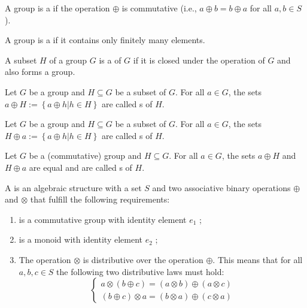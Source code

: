 \begin{defi}
A group \soplus is a  if the operation $\oplus$ is commutative (i.e., $a\oplus b = b\oplus a$ for all $a, b\in S$).
\cite{Oppliger:2011:CC:2049860}
\end{defi}

\begin{defi}
A group \soplus is a  if it contains only finitely many elements.
\cite{Oppliger:2011:CC:2049860}
\end{defi}

\begin{defi}[Subgroup]
A subset $H$ of a group $G$ is a  of $G$ if it is closed under the operation of $G$ and also forms a group.
\cite{Oppliger:2011:CC:2049860}
\end{defi}

\begin{defi}
Let $G$ be a group and $H\subseteq G$ be a subset of $G$. For all $a\in G$, the sets $a\oplus H := \left\{a\oplus h | h\in H\right\}$ are called s of $H$.
\cite{Oppliger:2011:CC:2049860}
\end{defi}

\begin{defi}
Let $G$ be a group and $H\subseteq G$ be a subset of $G$. For all $a\in G$, the sets $H\oplus a := \left\{a\oplus h | h\in H\right\}$ are called s of $H$.
\cite{Oppliger:2011:CC:2049860}
\end{defi}

\begin{defi}[Coset]
Let $G$ be a (commutative) group and $H\subseteq G$. For all $a\in G$, the sets $a\oplus H$ and $H\oplus a$ are equal and are called s of $H$.
\cite{Oppliger:2011:CC:2049860}
\end{defi}

\begin{defi}[Ring]
A  is an algebraic structure \soplusotimes with a set $S$ and two associative binary operations $\oplus$ and $\otimes$ that fulfill the following requirements:
\begin{enumerate}
 \item \soplus is a commutative group with identity element $e_1$ ;
 \item \sotimes is a monoid with identity element $e_2$ ;
 \item The operation $\otimes$ is distributive over the operation $\oplus$. This means that for all $a,b,c\in S$ the following two distributive laws must hold:
 \begin{equation}
 \left\{\begin{array}{c}
  a \otimes (b \oplus c)=(a \otimes b) \oplus (a \otimes c)\\
 (b \oplus c) \otimes a=(b \otimes a) \oplus (c \otimes a)
 \end{array}\right.
 \end{equation}
\end{enumerate}
\cite{Oppliger:2011:CC:2049860}
\end{defi}

